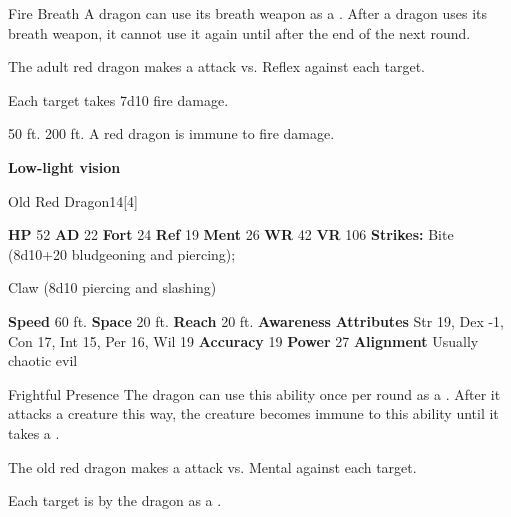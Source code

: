    \begin{freeability}{Fire Breath}
      A dragon can use its breath weapon as a .
      After a dragon uses its breath weapon, it cannot use it again until after the end of the next round.
      \par The adult red dragon makes a  attack
        vs. Reflex against each target.
    
    \hit Each target takes 7d10 fire damage.
    \end{freeability}
  
      
       50 ft.
     200 ft.
     A red dragon is immune to fire damage.
    \par\noindent\textbf{Low-light vision}
  

  \begin{monsubsection}{Old Red Dragon}{14}[4]
    \vspace{-1em}\vspace{-1em}
    \vspace{0em}

    
    

    \begin{spellcontent}
      \begin{spelltargetinginfo}
        \pari \textbf{HP} 52 \monsep
          \textbf{AD} 22 \monsep
          \textbf{Fort} 24 \monsep
          \textbf{Ref} 19 \monsep
          \textbf{Ment} 26
        \pari \textbf{WR} 42 \monsep
        \textbf{VR} 106
        \pari \textbf{Strikes:}
            Bite  (8d10+20 bludgeoning and piercing);
\par Claw  (8d10 piercing and slashing)
      \end{spelltargetinginfo}
    \end{spellcontent}
    \begin{monsterfooter}
      \pari \textbf{Speed} 60 ft. \monsep
        \textbf{Space} 20 ft. \monsep
        \textbf{Reach} 20 ft.
      \pari \textbf{Awareness} 
      \pari \textbf{Attributes}
        Str 19, Dex -1,
        Con 17, Int 15,
        Per 16, Wil 19
      \pari \textbf{Accuracy} 19 \monsep
        \textbf{Power} 27
      \pari \textbf{Alignment} Usually chaotic evil
    \end{monsterfooter}
  \end{monsubsection}
  \begin{freeability}{Frightful Presence}
      The dragon can use this ability once per round as a .
      After it attacks a creature this way, the creature becomes immune to this ability until it takes a .
      \par The old red dragon makes a  attack
        vs. Mental against each target.
    
    \hit Each target is  by the dragon as a .
    \end{freeability}
  

